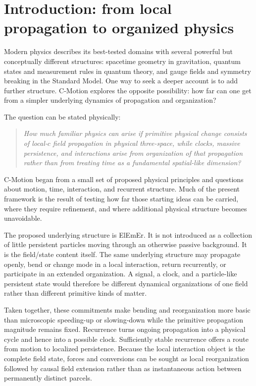 \documentclass[11pt]{article}
\theoremstyle{definition}
\newcommand{\cmotion}{\mbox{C-Motion}}
\newcommand{\ElEmEr}{\mbox{ElEmEr}}
\begin{document}
\medskip

\section{Introduction: from local propagation to organized physics}
\label{sec:introduction}

Modern physics describes its best-tested domains with several powerful but conceptually
different structures: spacetime geometry in gravitation, quantum states and measurement
rules in quantum theory, and gauge fields and symmetry breaking in the Standard Model.
One way to seek a deeper account is to add further structure.  \cmotion{} explores the
opposite possibility: how far can one get from a simpler underlying dynamics of
propagation and organization?

The question can be stated physically:
\begin{quote}
\emph{How much familiar physics can arise if primitive physical change consists of
local-$c$ field propagation in physical three-space, while clocks, massive persistence,
and interactions arise from organization of that propagation rather than from treating
time as a fundamental spatial-like dimension?}
\end{quote}

\cmotion{} began from a small set of proposed physical principles and questions about
motion, time, interaction, and recurrent structure.  Much of the present framework is
the result of testing how far those starting ideas can be carried, where they require
refinement, and where additional physical structure becomes unavoidable.

The proposed underlying structure is \ElEmEr{}.  It is not introduced as a collection of
little persistent particles moving through an otherwise passive background.  It is the
field/state content itself.  The same underlying structure may propagate openly, bend or
change mode in a local interaction, return recurrently, or participate in an extended
organization.  A signal, a clock, and a particle-like persistent state would therefore
be different dynamical organizations of one field rather than different primitive kinds
of matter.

Taken together, these commitments make bending and reorganization more basic than
microscopic speeding-up or slowing-down while the primitive propagation magnitude remains fixed.  Recurrence turns ongoing propagation into a physical cycle and hence into
a possible clock.  Sufficiently stable recurrence offers a route from motion to
localized persistence.  Because the local interaction object is the complete field
state, forces and conversions can be sought as local reorganization followed by causal
field extension rather than as instantaneous action between permanently distinct
parcels.
\end{document}
